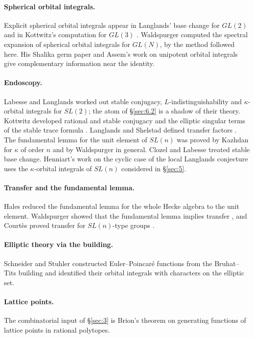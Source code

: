 \documentclass[12pt,letterpaper]{article}
\numberwithin{equation}{section}
\theoremstyle{plain}
\theoremstyle{remark}
\theoremstyle{plain}
\theoremstyle{definition}
\theoremstyle{remark}
\theoremstyle{remark}
\begin{document}
\paragraph{Spherical orbital integrals.} Explicit spherical orbital integrals appear in Langlands' base change for $GL(2)$ \cite{La80} and in Kottwitz's computation for $GL(3)$ \cite{Ko80}. Waldspurger \cite{Wa89a} computed the spectral expansion of spherical orbital integrals for $GL(N)$, by the method followed here. His Shalika germ paper \cite{Wa89b} and Assem's work on unipotent orbital integrals \cite{As91} give complementary information near the identity.

\paragraph{Endoscopy.} Labesse and Langlands \cite{LL79} worked out stable conjugacy, $L$-indistinguishability and $\kappa$-orbital integrals for $SL(2)$; the atom of \S\ref{sec:6.2} is a shadow of their theory. Kottwitz developed rational and stable conjugacy \cite{Ko82} and the elliptic singular terms of the stable trace formula \cite{Ko86}. Langlands and Shelstad defined transfer factors \cite{LS87}. The fundamental lemma for the unit element of $SL(n)$ was proved by Kazhdan \cite{Ka84} for $\kappa$ of order $n$ and by Waldspurger \cite{Wa91} in general. Clozel \cite{Cl90} and Labesse \cite{La90} treated stable base change. Henniart's work on the cyclic case of the local Langlands conjecture \cite{He86} uses the $\kappa$-orbital integrals of $SL(n)$ considered in \S\ref{sec:5}.

\paragraph{Transfer and the fundamental lemma.} Hales \cite{Ha95} reduced the fundamental lemma for the whole Hecke algebra to the unit element. Waldspurger showed that the fundamental lemma implies transfer \cite{Wa97}, and Court\`es proved transfer for $SL(n)$-type groups \cite{Co97}.

\paragraph{Elliptic theory via the building.} Schneider and Stuhler \cite{SS97} constructed Euler--Poincar\'e functions from the Bruhat--Tits building and identified their orbital integrals with characters on the elliptic set.

\paragraph{Lattice points.} The combinatorial input of \S\ref{sec:3} is Brion's theorem \cite{Br88} on generating functions of lattice points in rational polytopes.
\end{document}
